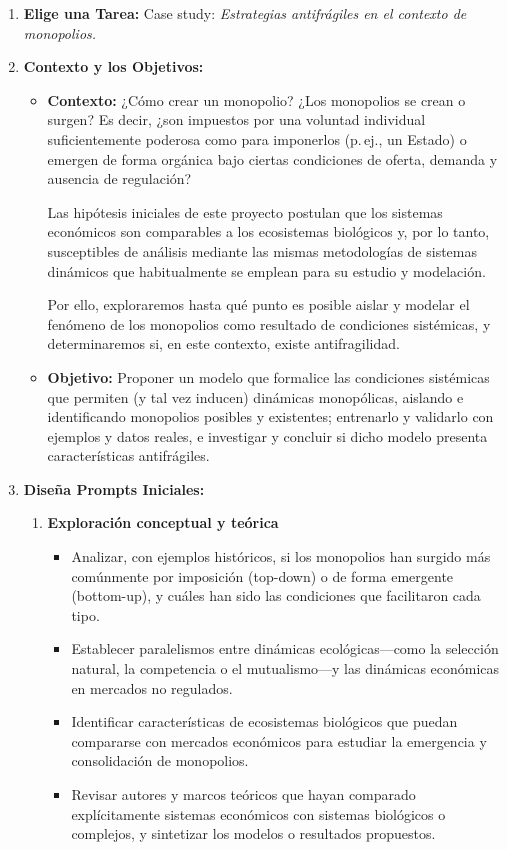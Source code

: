 \documentclass[a4paper,12pt]{article}
\begin{document}
\begin{enumerate}
    \item \textbf{Elige una Tarea:} Case study: \textit{Estrategias antifrágiles en el contexto de monopolios.}
    \item \textbf{Contexto y los Objetivos:}
    \begin{itemize}
    \item \textbf{Contexto:} ¿Cómo crear un monopolio? ¿Los monopolios se crean o surgen? Es decir, ¿son impuestos por una voluntad individual suficientemente poderosa como para imponerlos (p.\,ej., un Estado) o emergen de forma orgánica bajo ciertas condiciones de oferta, demanda y ausencia de regulación?

    Las hipótesis iniciales de este proyecto postulan que los sistemas económicos son comparables a los ecosistemas biológicos y, por lo tanto, susceptibles de análisis mediante las mismas metodologías de sistemas dinámicos que habitualmente se emplean para su estudio y modelación.

    Por ello, exploraremos hasta qué punto es posible aislar y modelar el fenómeno de los monopolios como resultado de condiciones sistémicas, y determinaremos si, en este contexto, existe antifragilidad.
    \item \textbf{Objetivo:} Proponer un modelo que formalice las condiciones sistémicas que permiten (y tal vez inducen) dinámicas monopólicas, aislando e identificando monopolios posibles y existentes; entrenarlo y validarlo con ejemplos y datos reales, e investigar y concluir si dicho modelo presenta características antifrágiles.
    \end{itemize}
    \item \textbf{Diseña Prompts Iniciales:}
    \begin{enumerate}
            \item \textbf{Exploración conceptual y teórica}
    \begin{itemize}
        \item Analizar, con ejemplos históricos, si los monopolios han surgido más comúnmente por imposición (top-down) o de forma emergente (bottom-up), y cuáles han sido las condiciones que facilitaron cada tipo.
        \item Establecer paralelismos entre dinámicas ecológicas—como la selección natural, la competencia o el mutualismo—y las dinámicas económicas en mercados no regulados.
        \item Identificar características de ecosistemas biológicos que puedan compararse con mercados económicos para estudiar la emergencia y consolidación de monopolios.
        \item Revisar autores y marcos teóricos que hayan comparado explícitamente sistemas económicos con sistemas biológicos o complejos, y sintetizar los modelos o resultados propuestos.
    \end{itemize}


\end{enumerate}
\end{enumerate}
\end{document}
